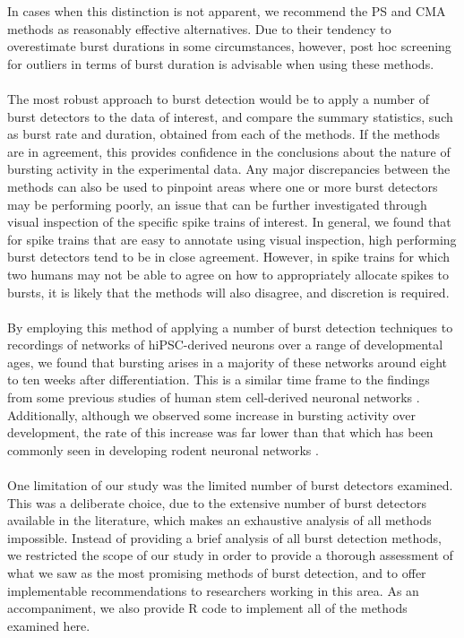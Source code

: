 \documentclass[12pt, titlepage]{article}
\begin{document}
	In cases when this distinction is not apparent, we recommend the PS and CMA methods as reasonably effective alternatives. Due to their tendency to overestimate burst durations in some circumstances, however, post hoc screening for outliers in terms of burst duration is advisable when using these methods. 
	\\ \\The most robust approach to burst detection would be to apply a number of burst detectors to the data of interest, and compare the summary statistics, such as burst rate and duration, obtained from each of the methods. %
	If the methods are in agreement, this provides confidence in the conclusions about the nature of bursting activity in the experimental data. Any major discrepancies between the methods can also be used to pinpoint areas where one or more burst detectors may be performing poorly, an issue that can be further investigated through visual inspection of the specific spike trains of interest. In general, we found that for spike trains that are easy to annotate using visual inspection, high performing burst detectors tend to be in close agreement. However, in spike trains for which two humans may not be able to agree on how to appropriately allocate spikes to bursts, it is likely that the methods will also disagree, and discretion is required.
	\\ \\By employing this method of applying a number of burst detection techniques to recordings of networks of hiPSC-derived neurons over a range of developmental ages, we found that bursting arises in a majority of these networks around eight to ten weeks after differentiation.  This is a similar time frame to the findings from some previous studies of human stem cell-derived neuronal networks \cite{Heikkila2009,Kirwan2015}. Additionally, although we observed some increase in bursting activity over development, the rate of this increase was far lower than that which has been commonly seen in developing rodent neuronal networks \cite{Chiappalone2005,Charlesworth2015,Wagenaar2006}.
	\\ \\One limitation of our study was the limited number of burst detectors examined. This was a deliberate choice, due to the extensive number of burst detectors available in the literature, which makes an exhaustive analysis of all methods impossible. Instead of providing a brief analysis of all burst detection methods, we restricted the scope of our study in order to provide a thorough assessment of what we saw as the most promising methods of burst detection, and to offer implementable recommendations to researchers working in this area. As an accompaniment, we also provide R code to implement all of the methods examined here.
\end{document}
